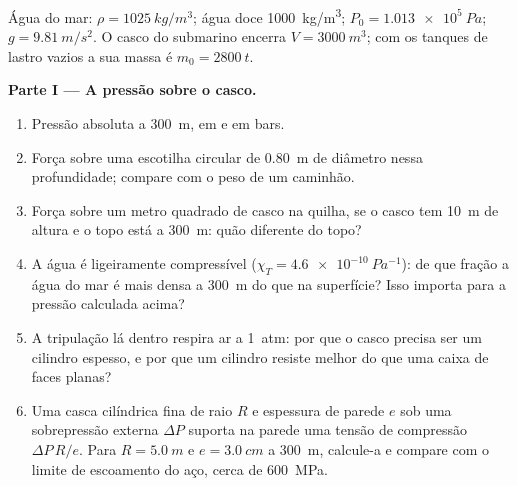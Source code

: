 \begin{problem}
\label{pb:b1:fluid-statics:1}
Água do mar: $\rho = \qty{1025}{kg/m^3}$; água doce \qty{1000}{kg/m^3};
$P_0 = \qty{1.013e5}{Pa}$; $g = \qty{9.81}{m/s^2}$. O casco do submarino
encerra $V = \qty{3000}{m^3}$; com os tanques de lastro vazios a sua massa é
$m_0 = \qty{2800}{t}$.

\medskip
\noindent\textbf{Parte I --- A pressão sobre o casco.}
\begin{enumerate}
  \item Pressão absoluta a \qty{300}{m}, em  e em bars.
  \item Força sobre uma escotilha circular de \qty{0.80}{m} de diâmetro
        nessa profundidade; compare com o peso de um caminhão.
  \item Força sobre um metro quadrado de casco na quilha, se o casco tem
        \qty{10}{m} de altura e o topo está a \qty{300}{m}: quão diferente
        do topo?
  \item A água é ligeiramente compressível ($\chi_T = \qty{4.6e-10}{Pa^{-1}}$):
        de que fração a água do mar é mais densa a \qty{300}{m} do que na
        superfície? Isso importa para a pressão calculada acima?
  \item A tripulação lá dentro respira ar a \qty{1}{atm}: por que o casco
        precisa ser um cilindro espesso, e por que um cilindro resiste
        melhor do que uma caixa de faces planas?
  \item Uma casca cilíndrica fina de raio $R$ e espessura de parede $e$
        sob uma sobrepressão externa $\Delta P$ suporta na parede uma
        tensão de compressão $\Delta P\,R/e$. Para $R = \qty{5.0}{m}$ e
        $e = \qty{3.0}{cm}$ a \qty{300}{m}, calcule-a e compare com o
        limite de escoamento do aço, cerca de \qty{600}{MPa}.
\end{enumerate}


\end{problem}
